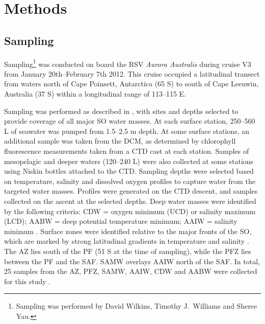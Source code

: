 \section{Methods}

\subsection{Sampling}


Sampling\footnote{Sampling was performed by David Wilkins, Timothy J.\ Williams and Sheree Yau.} was conducted on board the RSV \textit{Aurora Australis} during cruise V3 from January 20th--February 7th 2012.
This cruise occupied a latitudinal transect from waters north of Cape Poinsett, Antarctica (65\textdegree{} S) to south of Cape Leeuwin, Australia (37\textdegree{} S) within a longitudinal range of 113--115\textdegree{} E.

Sampling was performed as described in \citet{Wilkins:2012wg}, with sites and depths selected to provide coverage of all major \ac{SO} water masses.
At each surface station, \textapprox{}250--560 L of seawater was pumped from \textapprox{}1.5--2.5 m depth.
At some surface stations, an additional sample was taken from the \ac{DCM}, as determined by chlorophyll fluorescence measurements taken from a \ac{CTD} cast at each station.
Samples of mesopelagic and deeper waters (\textapprox{}120--240 L) were also collected at some stations using Niskin bottles attached to the \ac{CTD}.
Sampling depths were selected based on temperature, salinity and dissolved oxygen profiles to capture water from the targeted water masses.
Profiles were generated on the \ac{CTD} descent, and samples collected on the ascent at the selected depths.
Deep water masses were identified by the following criteria: \ac{CDW} = oxygen minimum (\ac{UCD}) or salinity maximum (\ac{LCD}); \ac{AABW} = deep potential temperature minimum; \ac{AAIW} = salinity minimum \cite{Foldvik:1988gp}.
Surface zones were identified relative to the major fronts of the \ac{SO}, which are marked by strong latitudinal gradients in temperature and salinity \cite{Sokolov:2002tc, Orsi:1995va}.
The \ac{AZ} lies south of the \ac{PF} (\textapprox{}51\textdegree{} S at the time of sampling), while the \ac{PFZ} lies between the \ac{PF} and the \ac{SAF}.
\ac{SAMW} overlays \ac{AAIW} north of the \ac{SAF}.
In total, 25 samples from the \ac{AZ}, \ac{PFZ}, \ac{SAMW}, \ac{AAIW}, \ac{CDW} and \ac{AABW} were collected for this study .

